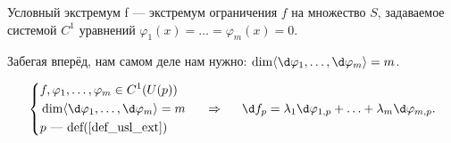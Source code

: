 \begin{to_def}
	Условный экстремум f --- экстремум ограничения $f$ на множество $S$, задаваемое системой $C^1$ уравнений $\varphi_1(x) = \ldots = \varphi_m(x) = 0$.

	Забегая вперёд, нам самом деле нам нужно: $\dim \langle \d \varphi_1, \ldots, \d \varphi_m\rangle = m$.
	\label{def_usl_ext}
\end{to_def}

\begin{to_thr}
	 \begin{equation*}
	 \left\{
	 	\begin{aligned}
	 		&f, \varphi_1,\ldots,\varphi_m \in C^1(U(p))\\
	 		&\dim \langle \d \varphi_1, \ldots, \d \varphi_m\rangle = m\\
	 		&p \text{ --- def(\ref{def_usl_ext})}
	 	\end{aligned}\right.
	 	\hspace*{0.5 cm} \Rightarrow \hspace*{0.5 cm}
	 	\d f_p = \lambda_1 \d \varphi_{1,p} + \ldots + \lambda_m \d \varphi_{m,p}.
	 \end{equation*}
	 \label{thr_6.42}
\end{to_thr}
